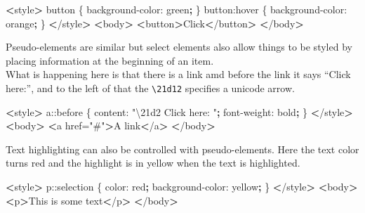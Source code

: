 \documentclass[]{book}
\newenvironment{Shaded}{\begin{snugshade}}{\end{snugshade}}
\newcommand{\KeywordTok}[1]{\textcolor[rgb]{0.13,0.29,0.53}{\textbf{#1}}}
\newcommand{\StringTok}[1]{\textcolor[rgb]{0.31,0.60,0.02}{#1}}
\newcommand{\OperatorTok}[1]{\textcolor[rgb]{0.81,0.36,0.00}{\textbf{#1}}}
\newcommand{\ExtensionTok}[1]{#1}
\newcommand{\NormalTok}[1]{#1}
\begin{document}
\begin{Shaded}
\begin{Highlighting}[]
\OperatorTok{<}\ExtensionTok{style}\OperatorTok{>}
    \ExtensionTok{button}\NormalTok{ \{}
        \ExtensionTok{background-color}\NormalTok{: green}\KeywordTok{;}
\NormalTok{    \}}
    \ExtensionTok{button}\NormalTok{:hover \{}
        \ExtensionTok{background-color}\NormalTok{: orange}\KeywordTok{;}
\NormalTok{    \}}
\OperatorTok{<}\NormalTok{/}\ExtensionTok{style}\OperatorTok{>}
\OperatorTok{<}\ExtensionTok{body}\OperatorTok{>}
    \OperatorTok{<}\ExtensionTok{button}\OperatorTok{>}\NormalTok{Click}\OperatorTok{<}\NormalTok{/button}\OperatorTok{>}
\OperatorTok{<}\NormalTok{/}\ExtensionTok{body}\OperatorTok{>}
\end{Highlighting}
\end{Shaded}

Pseudo-elements are similar but select elements also allow things to be
styled by placing information at the beginning of an item.\\
What is happening here is that there is a link amd before the link it
says ``Click here:'', and to the left of that the
\texttt{\textbackslash{}21d12} specifies a unicode arrow.

\begin{Shaded}
\begin{Highlighting}[]
\OperatorTok{<}\ExtensionTok{style}\OperatorTok{>}
    \ExtensionTok{a}\NormalTok{::before \{}
        \ExtensionTok{content}\NormalTok{: }\StringTok{"\textbackslash{}21d2 Click here: "}\KeywordTok{;}
        \ExtensionTok{font-weight}\NormalTok{: bold}\KeywordTok{;}
\NormalTok{    \}}
\OperatorTok{<}\NormalTok{/}\ExtensionTok{style}\OperatorTok{>}
\OperatorTok{<}\ExtensionTok{body}\OperatorTok{>}
    \OperatorTok{<}\ExtensionTok{a}\NormalTok{ href=}\StringTok{"#"}\OperatorTok{>}\NormalTok{A link}\OperatorTok{<}\NormalTok{/a}\OperatorTok{>}
\OperatorTok{<}\NormalTok{/}\ExtensionTok{body}\OperatorTok{>}
\end{Highlighting}
\end{Shaded}

Text highlighting can also be controlled with pseudo-elements. Here the
text color turns red and the highlight is in yellow when the text is
highlighted.

\begin{Shaded}
\begin{Highlighting}[]
\OperatorTok{<}\ExtensionTok{style}\OperatorTok{>}
    \ExtensionTok{p}\NormalTok{::selection \{}
        \ExtensionTok{color}\NormalTok{: red}\KeywordTok{;}
        \ExtensionTok{background-color}\NormalTok{: yellow}\KeywordTok{;}
\NormalTok{    \}}
\OperatorTok{<}\NormalTok{/}\ExtensionTok{style}\OperatorTok{>}
\OperatorTok{<}\ExtensionTok{body}\OperatorTok{>}
    \OperatorTok{<}\ExtensionTok{p}\OperatorTok{>}\NormalTok{This is some text}\OperatorTok{<}\NormalTok{/p}\OperatorTok{>}
\OperatorTok{<}\NormalTok{/}\ExtensionTok{body}\OperatorTok{>}
\end{Highlighting}
\end{Shaded}
\end{document}
